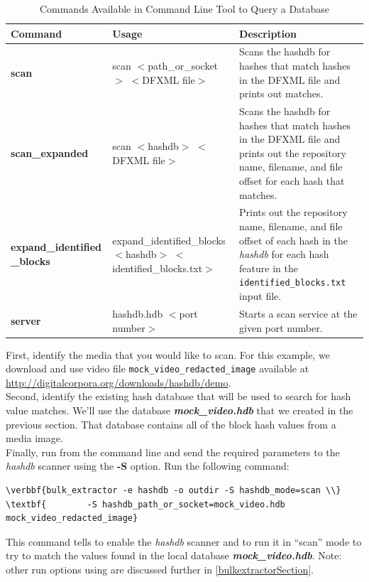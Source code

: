\documentclass[11pt,fleqn]{article} %
\begin{document}
\begin{table}[!ht]
\centering
\caption{Commands Available in \hash Command Line Tool to Query a Database}
\label{tab:scanServices}
\begin{tabular}{|p{3.5 cm}|p{6 cm}|p{4 cm}|}
\hline \hline
\textbf{Command} & \textbf{Usage} & \textbf{Description} \\
\hline
\textbf{scan} & scan $<$path\_or\_socket$>$ $<$DFXML file$>$ & Scans the hashdb for hashes that match hashes in the DFXML file and prints out matches.\\
\hline
\textbf{scan\_expanded} & scan $<$hashdb$>$ $<$DFXML file$>$ & Scans the hashdb for hashes that match hashes in the DFXML file and prints out the repository name, filename, and file offset for each hash that matches.\\
\hline
\textbf{expand\_identified} \textbf{\_blocks} & expand\_identified\_blocks $<$hashdb$>$ $<$identified\_blocks.txt$>$ & Prints out the repository name, filename, and file offset of each hash in the \textit{hashdb} for each hash feature in the \texttt{identified\_blocks.txt} input file.\\
\hline
\textbf{server} &  hashdb.hdb $<$port number$>$ & Starts a scan service at the given port number.\\
\hline
\end{tabular}
\end{table}

First, identify the media that you would like to scan. For this example, we download and use video file \texttt{mock\_video\_redacted\_image} available at \url{http://digitalcorpora.org/downloads/hashdb/demo}.\\ 

Second, identify the existing hash database that will be used to search for hash value matches. We'll use the database \textit{\textbf{mock\_video.hdb}} that we created in the previous section. That database contains all of the block hash values from a media image. \\

Finally, run \bulk from the command line and send the required parameters to the \textit{hashdb} scanner using the \textbf{-S} option. Run the following command: 
\begin{Verbatim}[commandchars=\\\{\}]
\verbbf{bulk_extractor -e hashdb -o outdir -S hashdb_mode=scan \\}
\textbf{        -S hashdb_path_or_socket=mock_video.hdb mock_video_redacted_image}
\end{Verbatim}
This command tells \bulk to enable the \textit{hashdb} scanner and to run it in ``scan'' mode to try to match the values found in the local database \textit{\textbf{mock\_video.hdb}}. Note: other run options using \bulk are discussed further in \ref{bulkextractorSection}.\\
\end{document}
